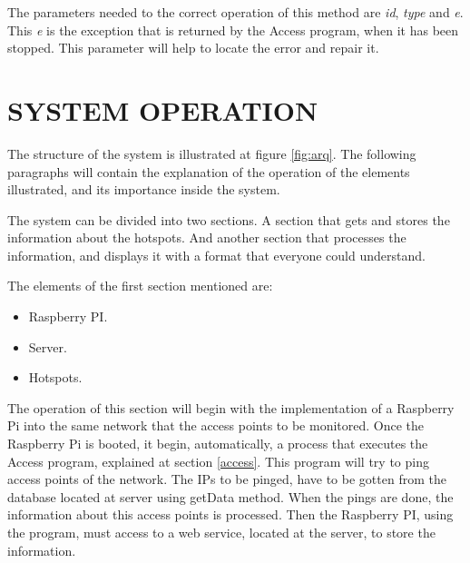 \documentclass[12pt, a4paper,twoside]{tesi_upf}
\begin{document}
                The parameters needed to the correct operation of this method are \textit{id}, \textit{type} and \textit{e}. This \textit{e} is the exception that is returned by the Access program, when it has been stopped. This parameter will help to locate the error and repair it.
                
 \chapter{SYSTEM OPERATION}
\label{Chapter4}

The structure of the system is illustrated at figure \ref{fig:arq}. The following paragraphs will contain the explanation of the operation of the elements illustrated, and its importance inside the system.
        
        The system can be divided into two sections. A section that gets and stores the information about the hotspots. And another section that processes the information, and displays it with a format that everyone could understand.
                
        The elements of the first section mentioned are: 
        \begin{itemize}
            \item Raspberry PI.
            \item Server.
            \item Hotspots. 
        \end{itemize}
        
        The operation of this section will begin with the implementation of a Raspberry Pi into the same network that the access points to be monitored. Once the Raspberry Pi is booted, it begin, automatically, a process that executes the Access program, explained at section \ref{access}. This program will try to ping access points of the network. The IPs to be pinged, have to be gotten from the database located at server using getData method. When the pings are done, the information about this access points is processed. Then the Raspberry PI, using the program, must access to a web service, located at the server, to store the information.
        
        
\end{document}
